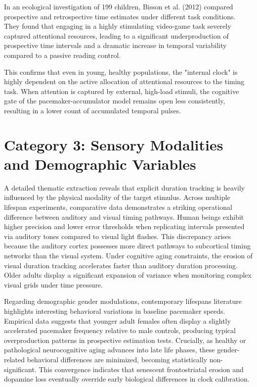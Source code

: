 \documentclass{custom_report}
\begin{document}
In an ecological investigation of 199 children, Bisson et al. (2012) compared prospective and retrospective time estimates under different task conditions. They found that engaging in a highly stimulating video-game task severely captured attentional resources, leading to a significant underproduction of prospective time intervals and a dramatic increase in temporal variability compared to a passive reading control. 

This confirms that even in young, healthy populations, the "internal clock" is highly dependent on the active allocation of attentional resources to the timing task. When attention is captured by external, high-load stimuli, the cognitive gate of the pacemaker-accumulator model remains open less consistently, resulting in a lower count of accumulated temporal pulses.

\section{Category 3: Sensory Modalities and Demographic Variables}
A detailed thematic extraction reveals that explicit duration tracking is heavily influenced by the physical modality of the target stimulus. Across multiple lifespan experiments, comparative data demonstrates a striking operational difference between auditory and visual timing pathways. Human beings exhibit higher precision and lower error thresholds when replicating intervals presented via auditory tones compared to visual light flashes. This discrepancy arises because the auditory cortex possesses more direct pathways to subcortical timing networks than the visual system. Under cognitive aging constraints, the erosion of visual duration tracking accelerates faster than auditory duration processing. Older adults display a significant expansion of variance when monitoring complex visual grids under time pressure.

Regarding demographic gender modulations, contemporary lifespans literature highlights interesting behavioral variations in baseline pacemaker speeds. Empirical data suggests that younger adult females often display a slightly accelerated pacemaker frequency relative to male controls, producing typical overproduction patterns in prospective estimation tests. Crucially, as healthy or pathological neurocognitive aging advances into late life phases, these gender-related behavioral differences are minimized, becoming statistically non-significant. This convergence indicates that senescent frontostriatal erosion and dopamine loss eventually override early biological differences in clock calibration.
\end{document}
